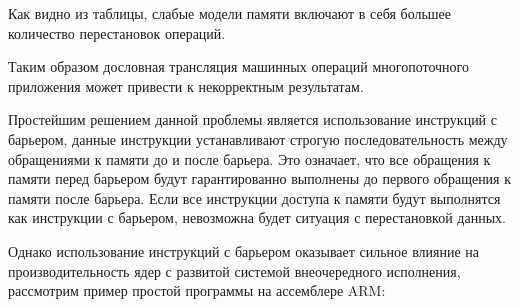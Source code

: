 \newpage

Как видно из таблицы, слабые модели памяти включают в себя большее количество перестановок операций. 

Таким образом дословная трансляция машинных операций многопоточного приложения может привести к некорректным результатам. 

Простейшим решением данной проблемы является использование инструкций с барьером, данные инструкции устанавливают строгую последовательность между обращениями к памяти до и после барьера. Это означает, что все обращения к памяти перед барьером будут гарантированно выполнены до первого обращения к памяти после барьера. Если все инструкции доступа к памяти будут выполнятся как инструкции с барьером, невозможна будет ситуация с перестановкой данных. 

Однако использование инструкций с барьером оказывает сильное влияние на производительность ядер с развитой системой внеочередного исполнения, рассмотрим пример простой программы на ассемблере ARM:


